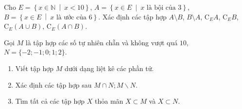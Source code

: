 \begin{bt}%
	Cho $E=\left\lbrace x \in \mathbb{N} \ \middle|\ x<10\right\rbrace $, $A=\left\lbrace x \in E \ \middle|\ x \text{ là bội của 3}\right\rbrace $, $B=\left\lbrace x \in E \ \middle|\ x \text{ là ước của 6}\right\rbrace $. Xác định các tập hợp $A \setminus B$, $B \setminus A$, $\mathrm{C}_{E} A$, $\mathrm{C}_{E} B$, $\mathrm{C}_{E}(A \cup B)$, $\mathrm{C}_{E}(A \cap B)$.
\end{bt}

\begin{bt}%
	Gọi $M$ là tập hợp các số tự nhiên chẵn và không vượt quá $10$, $N=\{-2 ;-1 ; 0 ; 1 ; 2\}$.
	\begin{enumerate}
		\item Viết tập hợp $M$ dưới dạng liệt kê các phần tử.
		\item Xác định các tập hợp sau $M \cap N ; M \backslash N$.
		\item Tìm tất cả các tập hợp $X$ thỏa mãn $X \subset M$ và $X \subset N$.
	\end{enumerate}
\end{bt}

